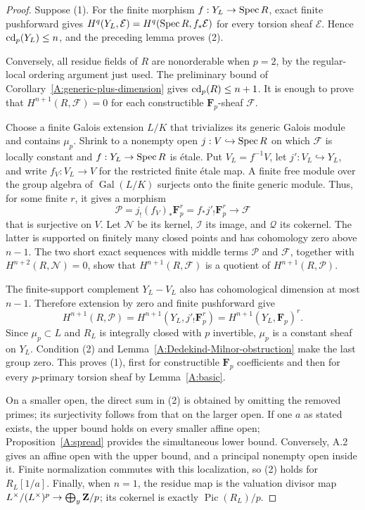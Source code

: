 \begin{proof}
Suppose (1). For the finite morphism $f:Y_L\to\operatorname{Spec} R$, exact
finite pushforward gives
$H^q(Y_L,\mathcal E)=H^q(\operatorname{Spec} R,f_*\mathcal E)$ for every torsion
sheaf $\mathcal E$. Hence $\operatorname{cd}_p(Y_L)\leq n$, and the preceding
lemma proves (2).

Conversely, all residue fields of $R$ are nonorderable when $p=2$,
by the regular-local ordering argument just used. The preliminary
bound of Corollary~\ref{A:generic-plus-dimension} gives
$\operatorname{cd}_p(R)\leq n+1$. It is enough to prove that
$H^{n+1}(R,\mathcal F)=0$ for each constructible
$\mathbf F_p$-sheaf $\mathcal F$.

Choose a finite Galois extension $L/K$ that trivializes its generic
Galois module and contains $\mu_p$. Shrink to a nonempty open
$j:V\hookrightarrow\operatorname{Spec} R$ on which $\mathcal F$ is locally
constant and $f:Y_L\to\operatorname{Spec} R$ is \'etale. Put
$V_L=f^{-1}V$, let $j':V_L\hookrightarrow Y_L$, and write
$f_V:V_L\to V$ for the restricted finite \'etale map. A finite
free module over the group algebra of $\operatorname{Gal}(L/K)$
surjects onto the finite generic module. Thus, for some finite $r$,
it gives a morphism
\[
 \mathcal P=j_!(f_V)_*\mathbf F_p^r
       =f_*j'_!\mathbf F_p^r\longrightarrow\mathcal F
\]
that is surjective on $V$. Let $\mathcal N$ be its kernel,
$\mathcal I$ its image, and $\mathcal Q$ its cokernel.
The latter is supported on finitely many closed points and has
cohomology zero above $n-1$. The two short exact sequences with
middle terms $\mathcal P$ and $\mathcal F$, together with
$H^{n+2}(R,\mathcal N)=0$, show that
$H^{n+1}(R,\mathcal F)$ is a quotient of
$H^{n+1}(R,\mathcal P)$.

The finite-support complement $Y_L-V_L$ also has cohomological
dimension at most $n-1$. Therefore extension by zero and finite
pushforward give
\[
 H^{n+1}(R,\mathcal P)
 =H^{n+1}(Y_L,j'_!\mathbf F_p^r)
 =H^{n+1}(Y_L,\mathbf F_p)^r.
\]
Since $\mu_p\subset L$ and $R_L$ is integrally closed with $p$
invertible, $\mu_p$ is a constant sheaf on $Y_L$. Condition (2)
and Lemma~\ref{A:Dedekind-Milnor-obstruction} make the last group
zero. This proves (1), first for constructible $\mathbf F_p$
coefficients and then for every $p$-primary torsion sheaf by
Lemma~\ref{A:basic}.

On a smaller open, the direct sum in (2) is obtained by omitting
the removed primes; its surjectivity follows from that on the
larger open. If one $a$ as stated exists, the upper bound holds on
every smaller affine open; Proposition~\ref{A:spread} provides the
simultaneous lower bound. Conversely, A.2 gives an affine open
with the upper bound, and a principal nonempty open inside it.
Finite normalization commutes with this localization, so (2)
holds for $R_L[1/a]$. Finally, when $n=1$, the residue map is the
valuation divisor map $L^\times/(L^\times)^p\to
\bigoplus_y\mathbf Z/p$; its cokernel is exactly
$\operatorname{Pic}(R_L)/p$.
\end{proof}

